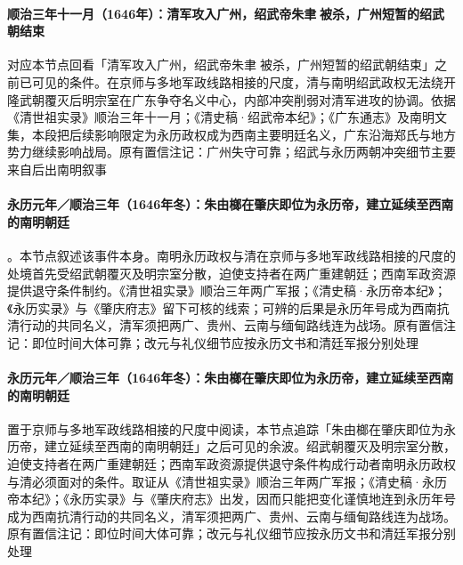 \paragraph{顺治三年十一月（1646年）：清军攻入广州，绍武帝朱聿𨮁被杀，广州短暂的绍武朝结束}
 对应本节点回看「清军攻入广州，绍武帝朱聿𨮁被杀，广州短暂的绍武朝结束」之前已可见的条件。在京师与多地军政线路相接的尺度，清与南明绍武政权无法绕开隆武朝覆灭后明宗室在广东争夺名义中心，内部冲突削弱对清军进攻的协调。依据《清世祖实录》顺治三年十一月；《清史稿·绍武帝本纪》；《广东通志》及南明文集，本段把后续影响限定为永历政权成为西南主要明廷名义，广东沿海郑氏与地方势力继续影响战局。原有置信注记：广州失守可靠；绍武与永历两朝冲突细节主要来自后出南明叙事

\paragraph{永历元年／顺治三年（1646年冬）：朱由榔在肇庆即位为永历帝，建立延续至西南的南明朝廷}
。本节点叙述该事件本身。南明永历政权与清在京师与多地军政线路相接的尺度的处境首先受绍武朝覆灭及明宗室分散，迫使支持者在两广重建朝廷；西南军政资源提供退守条件制约。《清世祖实录》顺治三年两广军报；《清史稿·永历帝本纪》；《永历实录》与《肇庆府志》留下可核的线索；可辨的后果是永历年号成为西南抗清行动的共同名义，清军须把两广、贵州、云南与缅甸路线连为战场。原有置信注记：即位时间大体可靠；改元与礼仪细节应按永历文书和清廷军报分别处理

\paragraph{永历元年／顺治三年（1646年冬）：朱由榔在肇庆即位为永历帝，建立延续至西南的南明朝廷}
 置于京师与多地军政线路相接的尺度中阅读，本节点追踪「朱由榔在肇庆即位为永历帝，建立延续至西南的南明朝廷」之后可见的余波。绍武朝覆灭及明宗室分散，迫使支持者在两广重建朝廷；西南军政资源提供退守条件构成行动者南明永历政权与清必须面对的条件。取证从《清世祖实录》顺治三年两广军报；《清史稿·永历帝本纪》；《永历实录》与《肇庆府志》出发，因而只能把变化谨慎地连到永历年号成为西南抗清行动的共同名义，清军须把两广、贵州、云南与缅甸路线连为战场。原有置信注记：即位时间大体可靠；改元与礼仪细节应按永历文书和清廷军报分别处理

